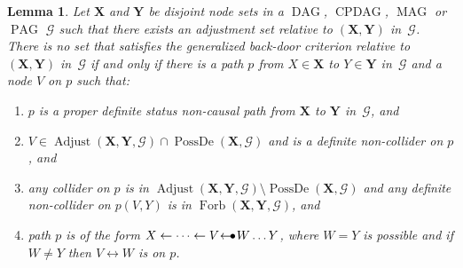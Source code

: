 \documentclass[11pt,a4paper]{article}
\newtheorem{lemma}[definition]{Lemma}
\DeclareMathOperator{\CPDAG}{CPDAG}
\DeclareMathOperator{\DAG}{DAG}
\DeclareMathOperator{\MAG}{MAG}
\DeclareMathOperator{\PAG}{PAG}
\DeclareMathOperator{\PossDe}{PossDe}
\DeclareMathOperator{\Adjust}{Adjust}
\DeclareMathOperator{\Forbi}{Forb}
\newcommand{\g}[1][G]{\mathcal{#1}}
\newcommand{\adjustb}[2][X,Y]{\Adjust(\mathbf{#1},#2)}
\newcommand{\fb}[2][X,Y]{\Forbi(\mathbf{#1},#2)}%
\newcommand{\arrowbullet}{
  \setlength{\unitlength}{1mm}
  \begin{picture}(5,1)(0,0)
    \put(0.2,0){$\leftarrow$}
    \put(3,0){$\bullet$}
  \end{picture}
}
\begin{document}
\begin{lemma} 
Let $\mathbf{X}$ and $\mathbf{Y}$ be disjoint node sets in a $\DAG$, $\CPDAG$, $\MAG$ or $\PAG$ $\g$ such that there exists an adjustment set relative to $(\mathbf{X,Y})$ in~$\g$. There is no set that satisfies the generalized back-door criterion relative to $(\mathbf{X,Y})$ in~$\g$ if and only if there is a path $p$ from $X \in \mathbf{X}$ to $Y \in \mathbf{Y}$ in~$\g$ and a node $V$ on $p$ such that:
\begin{enumerate}[label=(\roman*)]
\item\label{l:nogbc0} $p$ is a proper definite status non-causal path from $\mathbf{X}$ to $\mathbf{Y}$ in~$\g$, and
\item\label{l:nogbc1} $V \in \adjustb{\g} \cap \PossDe(\mathbf{X},\g)$ and is a definite non-collider on $p$, and
\item\label{l:nogbc2} any collider on $p$ is in $\adjustb{\g} \setminus \PossDe(\mathbf{X},\g)$ and any definite non-collider on $p(V,Y)$ is in $\fb{\g}$, and
\item\label{l:nogbc3} path $p$ is of the form $X \leftarrow \dots \leftarrow V \arrowbullet W \dots Y$, where $W=Y$ is possible and if $W \neq Y$ then $V \leftrightarrow W$ is on $p$.
\end{enumerate}
\label{lemma:no gbc path}
\end{lemma}
\end{document}
